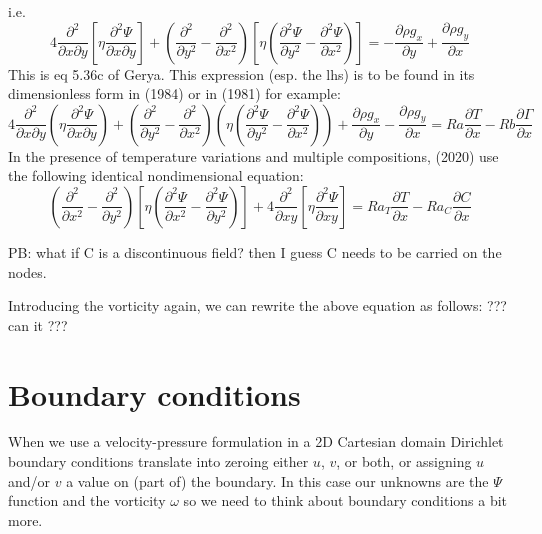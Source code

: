 i.e.
\[
\boxed{
4\frac{\partial^2 }{\partial x \partial y} 
\left[\eta \frac{\partial^2 \Psi}{\partial x \partial y}  \right]
+ 
\left( 
\frac{\partial^2 }{\partial y^2}
- \frac{\partial^2 }{\partial x^2}
\right)
\left[ \eta (\frac{\partial^2 \Psi}{\partial y^2}-\frac{\partial^2 \Psi}{\partial x^2}) \right]
=
- \frac{\partial \rho g_x}{\partial y}
+ \frac{\partial \rho g_y}{\partial x}
}
\]
This is eq 5.36c of Gerya. 
This expression (esp. the lhs) is to be found in its dimensionless form in 
\textcite{chyu84} (1984) or in \textcite{scja81} (1981) for example:
\[
4\frac{\partial^2 }{\partial x \partial y} 
\left(\eta \frac{\partial^2 \Psi}{\partial x \partial y} 
\right)
+ 
\left( 
\frac{\partial^2 }{\partial y^2}
- \frac{\partial^2 }{\partial x^2}
\right)
\left( \eta (\frac{\partial^2 \Psi}{\partial y^2}-\frac{\partial^2 \Psi}{\partial x^2}) \right)
+ \frac{\partial \rho g_x}{\partial y}
- \frac{\partial \rho g_y}{\partial x}
=
Ra \frac{\partial T}{\partial x}
-Rb \frac{\partial \Gamma}{\partial x}
\]
In the presence of temperature variations and multiple compositions, 
\textcite{trlb20} (2020)  use the  following identical nondimensional equation:
\[
\left(
\frac{\partial^2 }{\partial x^2} - 
\frac{\partial^2 }{\partial y^2}  
\right)
\left[ \eta
\left(
\frac{\partial^2 \Psi}{\partial x^2} - 
\frac{\partial^2 \Psi}{\partial y^2}  
\right)
\right]
+4
\frac{\partial^2 }{\partial xy} 
\left[
\eta 
\frac{\partial^2 \Psi}{\partial xy} 
\right]
=
Ra_T \frac{\partial T}{\partial x}-
Ra_C \frac{\partial C}{\partial x}
\]

PB: what if C is a discontinuous field? then I guess C needs to be carried on the nodes.

Introducing the vorticity again, 
we can rewrite the above equation as follows: ??? can it ???





\section{Boundary conditions}

When we use a velocity-pressure formulation in a 2D Cartesian domain Dirichlet boundary conditions 
translate into zeroing either $u$, $v$, or both, or assigning $u$ and/or $v$ a value on 
(part of) the boundary. In this case our unknowns are the $\Psi$ function and the vorticity $\omega$ 
so we need to think about boundary conditions a bit more.


